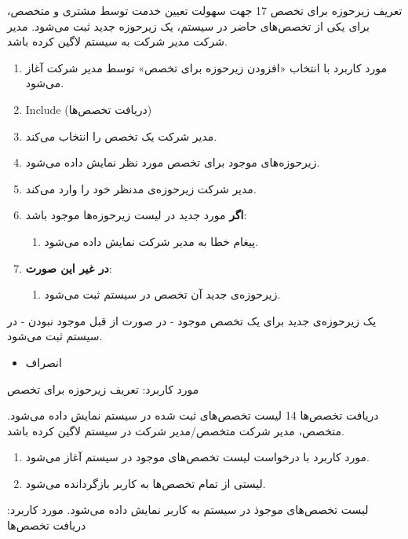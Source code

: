 {
	\usecase
	{تعریف زیرحوزه برای تخصص}
	{17}
	{جهت سهولت تعیین خدمت توسط مشتری و متخصص، برای یکی از تخصص‌های حاضر در سیستم، یک زیرحوزه جدید ثبت می‌شود.}
	{مدیر شرکت}
	{}
	{مدیر شرکت به سیستم لاگین کرده باشد.}
	{
		\vspace*{-0.6cm}
		\begin{enumerate}
			\item 
			مورد کاربرد با انتخاب «افزودن زیرحوزه برای تخصص» توسط مدیر شرکت آغاز می‌شود.
			\item Include (دریافت تخصص‌ها)
						\item مدیر شرکت یک تخصص را انتخاب می‌کند. 
			\item زیرحوزه‌های موجود برای تخصص مورد نظر نمایش داده می‌شود.
			\item مدیر شرکت زیرحوزه‌ی مدنظر خود را وارد می‌کند. 
			\item
			\textbf{اگر}
			مورد جدید در لیست زیرحوزه‌ها موجود باشد:
			\begin{enumerate}[label=\theenumi.\arabic*.]
				\item پیغام خطا به مدیر شرکت نمایش داده می‌شود.
			\end{enumerate}
			\item
			\textbf{در غیر این صورت}:
			\begin{enumerate}[label=\theenumi.\arabic*.]
				\item زیرحوزه‌ی جدید آن تخصص در سیستم ثبت می‌شود.
			\end{enumerate}		
		\end{enumerate}
	}
	{یک زیرحوزه‌ی جدید برای یک تخصص موجود - در صورت از قبل موجود نبودن - در سیستم ثبت می‌شود.}
	{
		\begin{itemize}
			\vspace*{-0.6cm}
			\item انصراف
		\end{itemize}
	}
	{
		مورد کاربرد: تعریف زیرحوزه برای تخصص
	}
	
}







{
	\usecase
	{دریافت تخصص‌ها}
	{14}
	{لیست تخصص‌های ثبت شده در سیستم نمایش داده می‌شود.}
	{متخصص، مدیر شرکت}
	{}
	{متخصص/مدیر شرکت در سیستم لاگین کرده باشد.}
	{
		\vspace*{-0.6cm}
		\begin{enumerate}
			\item مورد کاربرد با درخواست لیست تخصص‌های موجود در سیستم آغاز می‌شود.
			\item لیستی از تمام تخصص‌ها به کاربر بازگردانده می‌شود.
		\end{enumerate}
	}
	{لیست تخصص‌های موجوذ در سیستم به کاربر نمایش داده می‌شود.}
	{
	}
	{
		مورد کاربرد: دریافت تخصص‌ها
	}
}


